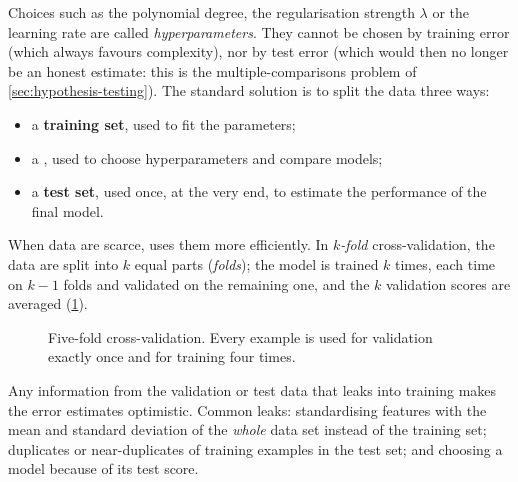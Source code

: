 Choices such as the polynomial degree, the regularisation strength $\lambda$ or
the learning rate are called \emph{hyperparameters}. They cannot be chosen by
training error (which always favours complexity), nor by test error (which would
then no longer be an honest estimate: this is the multiple-comparisons problem of
\cref{sec:hypothesis-testing}). The standard solution is to split the data three
ways:
\begin{itemize}
  \item a \textbf{training set}, used to fit the parameters;
  \item a , used to choose hyperparameters and compare models;
  \item a \textbf{test set}, used once, at the very end, to estimate the
    performance of the final model.
\end{itemize}

When data are scarce,  uses them more efficiently. In
\emph{$k$-fold} cross-validation, the data are split into $k$ equal parts
(\emph{folds}); the model is trained $k$ times, each time on $k - 1$ folds and
validated on the remaining one, and the $k$ validation scores are averaged
(\cref{fig:cross-validation}).

\begin{figure}[htbp]
\centering
{}
\caption{Five-fold cross-validation. Every example is used for validation exactly
  once and for training four times.}
\label{fig:cross-validation}
\end{figure}

\begin{pitfall}
Any information from the validation or test data that leaks into training makes
the error estimates optimistic. Common leaks: standardising features with the
mean and standard deviation of the \emph{whole} data set instead of the training
set; duplicates or near-duplicates of training examples in the test set; and
choosing a model because of its test score.
\end{pitfall}

